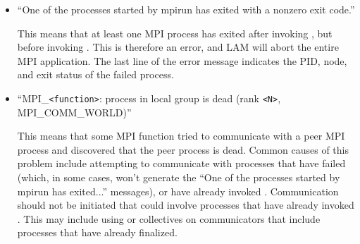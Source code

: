 \begin{itemize}
\item ``One of the processes started by mpirun has exited with a
  nonzero exit code.''
  
  This means that at least one MPI process has exited after invoking
  , but before invoking
  .  This is therefore an error, and LAM will
  abort the entire MPI application.  The last line of the error
  message indicates the PID, node, and exit status of the failed
  process.
  
\item ``MPI\_{\tt <function>}: process in local group is dead (rank
  {\tt <N>}, MPI\_\-COMM\_\-WORLD)''
  
  This means that some MPI function tried to communicate with a peer
  MPI process and discovered that the peer process is dead.  Common
  causes of this problem include attempting to communicate with
  processes that have failed (which, in some cases, won't generate the
  ``One of the processes started by mpirun has exited...'' messages),
  or have already invoked .  Communication
  should not be initiated that could involve processes that have
  already invoked .  This may include using
   or collectives on communicators that
  include processes that have already finalized.
\end{itemize}
